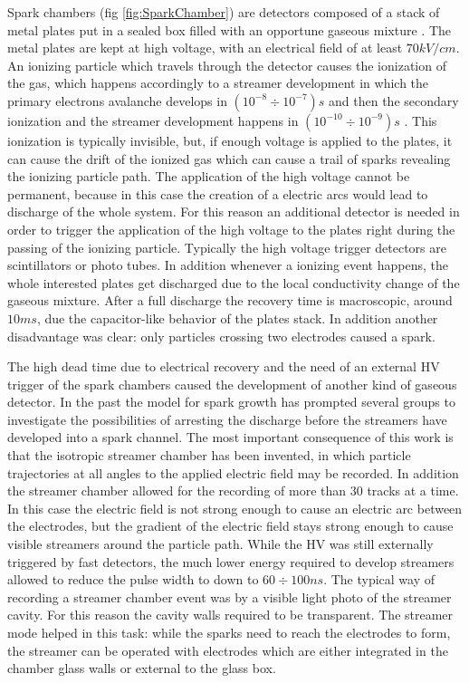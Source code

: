 Spark chambers (fig \ref{fig:SparkChamber}) are detectors composed of a stack of metal plates put in a sealed box filled with an opportune gaseous mixture \cite{wenzel:1966}.
The metal plates are kept at high voltage, with an electrical field of at least $70 kV/cm$.
An ionizing particle which travels through the detector causes the ionization of the gas, which happens accordingly to a streamer development in which the primary electrons avalanche develops in $(10^{-8}÷10^{-7})s$ and then the secondary ionization and the streamer development happens in $(10^{-10}÷10^{-9})s$ \cite{wenzel:1966}.
This ionization is typically invisible, but, if enough voltage is applied to the plates, it can cause the drift of the ionized gas which can cause a trail of sparks revealing the ionizing particle path.
The application of the high voltage cannot be permanent, because in this case the creation of a electric arcs would lead to discharge of the whole system.
For this reason an additional detector is needed in order to trigger the application of the high voltage to the plates right during the passing of the ionizing particle.
Typically the high voltage trigger detectors are scintillators or photo tubes. 
In addition whenever a ionizing event happens, the whole interested plates get discharged due to the local conductivity change of the gaseous mixture.
After a full discharge the recovery time is macroscopic, around $10ms$, due the capacitor-like behavior of the plates stack.
In addition another disadvantage was clear: only particles crossing two electrodes caused a spark.

The high dead time due to electrical recovery and the need of an external HV trigger of the spark chambers caused the development of another kind of gaseous detector.
In the past the model for spark growth has prompted several groups \cite{chicovani:1964} to investigate the possibilities of arresting the discharge before the streamers have developed into a spark channel.
The most important consequence of this work is that the isotropic streamer chamber has been invented, in which particle trajectories at all angles to the applied electric field may be recorded.
In addition the streamer chamber allowed for the recording of more than $30$ tracks at a time.
In this case the electric field is not strong enough to cause an electric arc between the electrodes, but the gradient of the electric field stays strong enough to cause visible streamers around the particle path.
While the HV was still externally triggered by fast detectors, the much lower energy required to develop streamers allowed to reduce the pulse width to down to $60÷100ns$.
The typical way of recording a streamer chamber event was by a visible light photo of the streamer cavity.
For this reason the cavity walls required to be transparent.
The streamer mode helped in this task: while the sparks need to reach the electrodes to form, the streamer can be operated with electrodes which are either integrated in the chamber glass walls or external to the glass box.

